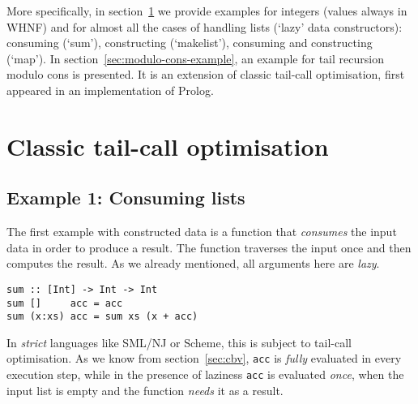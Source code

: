 \documentclass[diploma]{softlab-thesis}
\begin{document}
More specifically, in section~\ref{sec:classic-tco-examples} we provide examples for integers (values always in WHNF) and 
for almost all the cases of handling lists (`lazy' data constructors): 
consuming (`sum'), constructing (`makelist'), consuming and constructing (`map'). 
In section~\ref{sec:modulo-cons-example}, an example for tail recursion modulo cons is presented. It is an extension of classic 
tail-call optimisation, first appeared in an implementation of Prolog.


\section {Classic tail-call optimisation}
\label{sec:classic-tco-examples}





\subsection {Example 1: Consuming lists}
\label{sec:example1}

The first example with constructed data is a 
function that \textit{consumes} the input data in 
order to produce a result.  The function traverses 
the input once and then computes the result. As we 
already mentioned, all arguments here are \textit{lazy}.

\begin{verbatim}
sum :: [Int] -> Int -> Int
sum []     acc = acc
sum (x:xs) acc = sum xs (x + acc)
\end{verbatim}

In \textit{strict} languages like SML/NJ or Scheme,
this is subject to tail-call optimisation. As we know from section~\ref{sec:cbv},
\texttt{acc} is \textit{fully} evaluated in every execution step, while in the
presence of laziness \texttt{acc} is evaluated \textit{once}, when the input 
list is empty and the function \textit{needs} it as a result.
\end{document}
